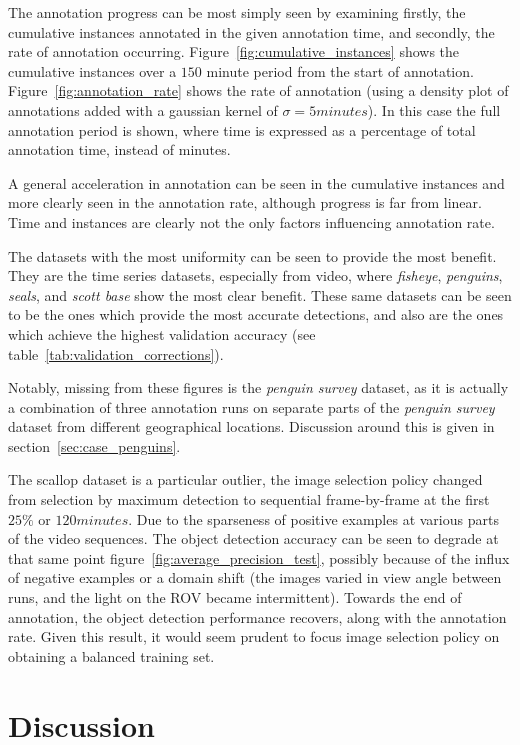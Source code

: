 The annotation progress can be most simply seen by examining firstly, the cumulative instances annotated in the given annotation time, and secondly, the rate of annotation occurring. Figure~\ref{fig:cumulative_instances} shows the cumulative instances over a $150$ minute period from the start of annotation. Figure~\ref{fig:annotation_rate} shows the rate of annotation (using a density plot of annotations added with a gaussian kernel of $\sigma = 5 minutes$). In this case the full annotation period is shown, where time is expressed as a percentage of total annotation time, instead of minutes.

A general acceleration in annotation can be seen in the  cumulative instances and more clearly seen in the annotation rate, although progress is far from linear. Time and instances are clearly not the only factors influencing annotation rate. 

The datasets with the most uniformity can be seen to provide the most benefit. They are the time series datasets, especially from video, where \emph{fisheye}, \emph{penguins}, \emph{seals}, and \emph{scott base} show the most clear benefit. These same datasets can be seen to be the ones which provide the most accurate detections, and also are the ones which achieve the highest validation accuracy (see table~\ref{tab:validation_corrections}).

Notably, missing from these figures is the \emph{penguin survey} dataset, as it is actually a combination of three annotation runs on separate parts of the \emph{penguin survey} dataset from different geographical locations. Discussion around this is given in section~\ref{sec:case_penguins}.

The scallop dataset is a particular outlier, the image selection policy changed from selection by maximum detection to sequential frame-by-frame at the first $25\%$ or $120 minutes$. Due to the sparseness of positive examples at various parts of the video sequences. The object detection accuracy can be seen to degrade at that same point figure~\ref{fig:average_precision_test}, possibly because of the influx of negative examples or a domain shift (the images varied in view angle between runs, and the light on the \gls{ROV} became intermittent). Towards the end of annotation, the object detection performance recovers, along with the annotation rate. Given this result, it would seem prudent to focus image selection policy on obtaining a balanced training set. 

\section{Discussion}
\label{sec:discussion}

